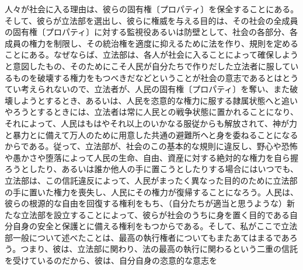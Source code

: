 人々が社会に入る理由は、彼らの固有権〔プロパティ〕を保全することにある。そして、彼らが立法部を選出し、彼らに権威を与える目的は、その社会の全成員の固有権〔プロパティ〕に対する監視役あるいは防壁として、社会の各部分、各成員の権力を制限し、その統治権を適度に抑えるために法を作り、規則を定めることにある。なぜならば、立法部は、各人が社会に入ることによって確保しようと意図したもの、そのためにこそ人民が自分たちで作りだした立法者に服しているものを破壊する権力をもつべきだなどということが社会の意志であるとはとうてい考えられないので、立法者が、人民の固有権〔プロパティ〕を奪い、また破壊しようとするとき、あるいは、人民を恣意的な権力に服する隷属状態へと追いやろうとするときには、立法者は常に人民との戦争状態に置かれることになり、それによって、人民はもはやそれ以上のいかなる服従からも解放されて、神が力と暴力とに備えて万人のために用意した共通の避難所へと身を委ねることになるからである。従って、立法部が、社会のこの基本的な規則に違反し、野心や恐怖や愚かさや堕落によって人民の生命、自由、資産に対する絶対的な権力を自ら握ろうとしたり、あるいは誰か他人の手に置こうとしたりする場合にはいつでも、立法部は、この信託違反によって、人民がまったく異なった目的のために立法部の手に置いた権力を喪失し、人民にその権力が復帰することになろう。人民は、彼らの根源的な自由を回復する権利をもち、（自分たちが適当と思うような）新たな立法部を設立することによって、彼らが社会のうちに身を置く目的である自分自身の安全と保護とに備える権利をもつからである。そして、私がここで立法部一般について述べたことは、最高の執行権者についてもまたあてはまるであろう。つまり、彼は、立法部に関わり、法の最高の執行に関わるという二重の信託を受けているのだから、彼は、自分自身の恣意的な意志を